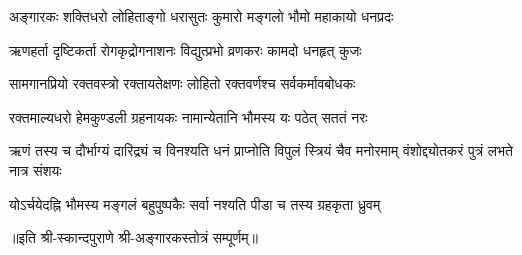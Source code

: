 

\twolineshloka
{अङ्गारकः शक्तिधरो लोहिताङ्गो धरासुतः}
{कुमारो मङ्गलो भौमो महाकायो धनप्रदः}

\twolineshloka
{ऋणहर्ता दृष्टिकर्ता रोगकृद्रोगनाशनः}
{विद्युत्प्रभो व्रणकरः कामदो धनहृत् कुजः}

\twolineshloka
{सामगानप्रियो रक्तवस्त्रो रक्तायतेक्षणः}
{लोहितो रक्तवर्णश्च सर्वकर्मावबोधकः}

\twolineshloka
{रक्तमाल्यधरो हेमकुण्डली ग्रहनायकः}
{नामान्येतानि भौमस्य यः पठेत् सततं नरः}

\threelineshloka
{ऋणं तस्य च दौर्भाग्यं दारिद्र्यं च विनश्यति}
{धनं प्राप्नोति विपुलं स्त्रियं चैव मनोरमाम्}
{वंशोद्द्योतकरं पुत्रं लभते नात्र संशयः}

\twolineshloka
{योऽर्चयेदह्नि भौमस्य मङ्गलं बहुपुष्पकैः}
{सर्वा नश्यति पीडा च तस्य ग्रहकृता ध्रुवम्}

॥इति श्री-स्कान्दपुराणे श्री-अङ्गारकस्तोत्रं सम्पूर्णम्॥